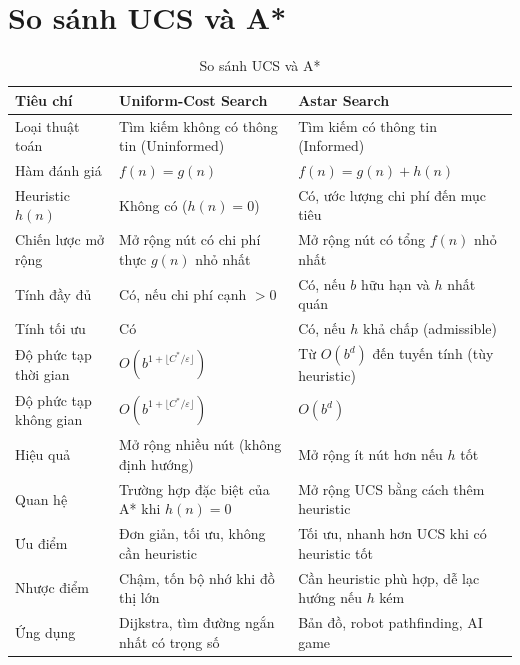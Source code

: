 \section{So sánh UCS và A*}

\begin{table}[H]
\centering
\begin{tabular}{|p{4cm}|p{5cm}|p{5cm}|}
\hline
\textbf{Tiêu chí} & \textbf{Uniform-Cost Search} & \textbf{Astar Search} \\ \hline
Loại thuật toán & Tìm kiếm không có thông tin (Uninformed) & Tìm kiếm có thông tin (Informed) \\ \hline
Hàm đánh giá & $f(n) = g(n)$ & $f(n) = g(n) + h(n)$ \\ \hline
Heuristic $h(n)$ & Không có ($h(n)=0$) & Có, ước lượng chi phí đến mục tiêu \\ \hline
Chiến lược mở rộng & Mở rộng nút có chi phí thực $g(n)$ nhỏ nhất & Mở rộng nút có tổng $f(n)$ nhỏ nhất \\ \hline
Tính đầy đủ & Có, nếu chi phí cạnh $>0$ & Có, nếu $b$ hữu hạn và $h$ nhất quán \\ \hline
Tính tối ưu & Có & Có, nếu $h$ khả chấp (admissible) \\ \hline
Độ phức tạp thời gian & $O(b^{1+\lfloor C^*/\varepsilon \rfloor})$ & Từ $O(b^d)$ đến tuyến tính (tùy heuristic) \\ \hline
Độ phức tạp không gian & $O(b^{1+\lfloor C^*/\varepsilon \rfloor})$ & $O(b^d)$ \\ \hline
Hiệu quả & Mở rộng nhiều nút (không định hướng) & Mở rộng ít nút hơn nếu $h$ tốt \\ \hline
Quan hệ & Trường hợp đặc biệt của A* khi $h(n)=0$ & Mở rộng UCS bằng cách thêm heuristic \\ \hline
Ưu điểm & Đơn giản, tối ưu, không cần heuristic & Tối ưu, nhanh hơn UCS khi có heuristic tốt \\ \hline
Nhược điểm & Chậm, tốn bộ nhớ khi đồ thị lớn & Cần heuristic phù hợp, dễ lạc hướng nếu $h$ kém \\ \hline
Ứng dụng & Dijkstra, tìm đường ngắn nhất có trọng số & Bản đồ, robot pathfinding, AI game \\ \hline
\end{tabular}
\caption{So sánh UCS và A*}
\end{table}